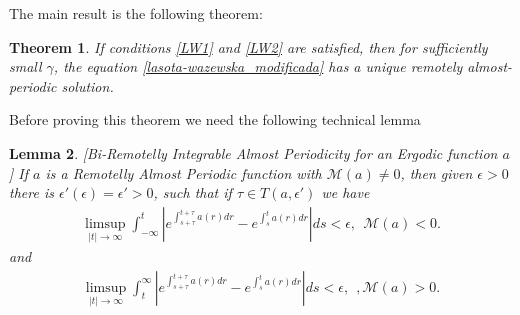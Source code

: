 \documentclass[english,,reqno]{amsart}
\numberwithin{equation}{section}
\theoremstyle{plain}
\newtheorem{thm}{Theorem}[section]
\newtheorem{lem}[thm]{Lemma}
\theoremstyle{definition}
\theoremstyle{remark}
\begin{document}
The main result is the following theorem:

\begin{thm}\label{gamma_small_unique_sol}
If conditions \ref{LW1} and \ref{LW2} are satisfied, then for sufficiently small $\gamma$,  
the equation \eqref{lasota-wazewska_modificada} has a unique remotely almost-periodic solution.
\end{thm}

Before proving this theorem we need the following technical lemma

\begin{lem}\label{BIRAP_exp_neg}[Bi-Remotelly Integrable Almost Periodicity for an Ergodic function $a$]
If $a$ is a Remotelly Almost Periodic function with $\mathcal{M}(a)\neq 0$, then given $\epsilon>0$ there is $\epsilon'(\epsilon)=\epsilon'>0$, such that if  $\tau\in T(a,\epsilon')$  we have
\begin{eqnarray*}
\limsup_{\vert t \vert \rightarrow \infty} \int_{-\infty}^{t}\left\vert e^{\int_{s+\tau}^{t+\tau}a(r)dr}-e^{\int_{s}^{t}a(r)dr}\right\vert ds < \epsilon ,\ \ \mathcal{M}(a)<0.
\end{eqnarray*}
and
\begin{eqnarray*}
\limsup_{\vert t \vert \rightarrow \infty} \int^{\infty}_{t}\left\vert e^{\int_{s+\tau}^{t+\tau}a(r)dr}-e^{\int_{s}^{t}a(r)dr}\right\vert ds < \epsilon,\ \ , \mathcal{M}(a)>0.
\end{eqnarray*}
\end{lem}
\end{document}
